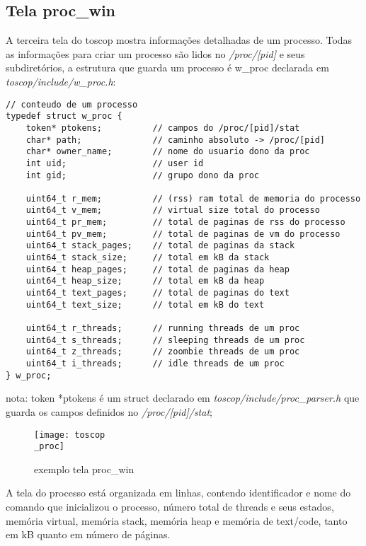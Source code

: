 \documentclass{article}
\begin{document}
\subsection{Tela proc\_win}
A terceira tela do toscop mostra informações detalhadas de um processo. Todas
as informações para criar um processo são lidos no \textit{/proc/[pid]} e seus
subdiretórios, a estrutura que guarda um processo é w\_proc declarada
em \textit{toscop/include/w\_proc.h}:
\begin{verbatim}
// conteudo de um processo
typedef struct w_proc {
    token* ptokens;          // campos do /proc/[pid]/stat
    char* path;              // caminho absoluto -> /proc/[pid]
    char* owner_name;        // nome do usuario dono da proc
    int uid;                 // user id
    int gid;                 // grupo dono da proc

    uint64_t r_mem;          // (rss) ram total de memoria do processo 
    uint64_t v_mem;          // virtual size total do processo
    uint64_t pr_mem;         // total de paginas de rss do processo
    uint64_t pv_mem;         // total de paginas de vm do processo
    uint64_t stack_pages;    // total de paginas da stack
    uint64_t stack_size;     // total em kB da stack
    uint64_t heap_pages;     // total de paginas da heap
    uint64_t heap_size;      // total em kB da heap
    uint64_t text_pages;     // total de paginas do text
    uint64_t text_size;      // total em kB do text

    uint64_t r_threads;      // running threads de um proc
    uint64_t s_threads;      // sleeping threads de um proc 
    uint64_t z_threads;      // zoombie threads de um proc
    uint64_t i_threads;      // idle threads de um proc
} w_proc;
\end{verbatim}
nota: token *ptokens é um struct declarado em \textit{toscop/include/proc\_parser.h} que guarda os campos definidos no \textit{/proc/[pid]/stat};
\begin{figure}[hb]
    \centering
    \texttt{[image: toscop\\\_proc]}
    \caption{exemplo tela proc\_win}
\end{figure}

A tela do processo está organizada em linhas, contendo identificador e
nome do comando que inicializou o processo, número total
de threads e seus estados, memória virtual, memória stack, memória
heap e memória de text/code, tanto em kB quanto em número de páginas.
\end{document}
